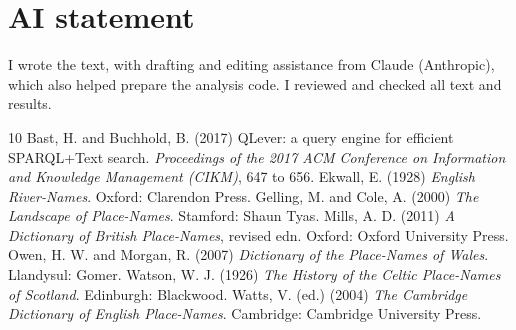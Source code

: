 \documentclass[11pt,a4paper]{article}
\begin{document}
\section*{AI statement}
I wrote the text, with drafting and editing assistance from Claude (Anthropic), which also helped prepare the analysis code. I reviewed and checked all text and results.

\begin{thebibliography}{10}
 Bast, H. and Buchhold, B. (2017) QLever: a query engine for efficient SPARQL+Text search. \textit{Proceedings of the 2017 ACM Conference on Information and Knowledge Management (CIKM)}, 647 to 656.
 Ekwall, E. (1928) \textit{English River-Names}. Oxford: Clarendon Press.
 Gelling, M. and Cole, A. (2000) \textit{The Landscape of Place-Names}. Stamford: Shaun Tyas.
 Mills, A. D. (2011) \textit{A Dictionary of British Place-Names}, revised edn. Oxford: Oxford University Press.
 Owen, H. W. and Morgan, R. (2007) \textit{Dictionary of the Place-Names of Wales}. Llandysul: Gomer.
 Watson, W. J. (1926) \textit{The History of the Celtic Place-Names of Scotland}. Edinburgh: Blackwood.
 Watts, V. (ed.) (2004) \textit{The Cambridge Dictionary of English Place-Names}. Cambridge: Cambridge University Press.
\end{thebibliography}
\end{document}
